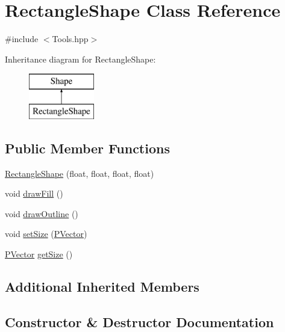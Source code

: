 \hypertarget{class_rectangle_shape}{}\section{Rectangle\+Shape Class Reference}
\label{class_rectangle_shape}


{\ttfamily \#include $<$Tools.\+hpp$>$}

Inheritance diagram for Rectangle\+Shape\+:\begin{figure}[H]
\begin{center}
\leavevmode
\includegraphics[height=2.000000cm]{class_rectangle_shape}
\end{center}
\end{figure}
\subsection*{Public Member Functions}
\begin{DoxyCompactItemize}
\item 
\hyperlink{class_rectangle_shape_aaca6ad79b0f0f6a2cdd3b07cb7d132ed}{Rectangle\+Shape} (float, float, float, float)
\item 
void \hyperlink{class_rectangle_shape_a5981b643c3f26733159e92910eaa25ee}{draw\+Fill} ()
\item 
void \hyperlink{class_rectangle_shape_af4c688f1ad48c2ba76970d93d19f5b4b}{draw\+Outline} ()
\item 
void \hyperlink{class_rectangle_shape_a8736f7ba16291db873ad9d31570bba06}{set\+Size} (\hyperlink{struct_p_vector}{P\+Vector})
\item 
\hyperlink{struct_p_vector}{P\+Vector} \hyperlink{class_rectangle_shape_a4788f9784e80e4bfbfa913207d98c558}{get\+Size} ()
\end{DoxyCompactItemize}
\subsection*{Additional Inherited Members}


\subsection{Constructor \& Destructor Documentation}
\hypertarget{class_rectangle_shape_aaca6ad79b0f0f6a2cdd3b07cb7d132ed}{}\label{class_rectangle_shape_aaca6ad79b0f0f6a2cdd3b07cb7d132ed} 
